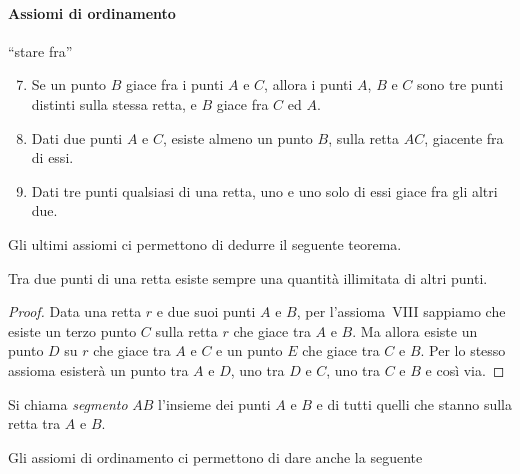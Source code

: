 \paragraph{Assiomi di ordinamento} ``stare fra''
\begin{enumerate}[label=\Roman{*}., nosep]
\setcounter{enumi}{6}
\item Se un punto \(B\) giace fra i punti \(A\) e \(C\), allora i punti 
\(A\), \(B\) e \(C\) sono tre punti distinti sulla stessa retta, e \(B\) 
giace fra \(C\) ed \(A\).
\item Dati due punti \(A\) e \(C\), esiste almeno un punto \(B\), sulla 
retta \(AC\), giacente fra di essi.
\item Dati tre punti qualsiasi di una retta, uno e uno solo di essi 
giace fra gli altri due.
\end{enumerate}

\begin{inaccessibleblock}
 \begin{center} \end{center}
\end{inaccessibleblock}

Gli ultimi assiomi ci permettono di dedurre il seguente teorema.
\begin{teorema}
Tra due punti di una retta esiste sempre una quantità illimitata di 
altri punti.
\end{teorema}

\begin{proof}
Data una retta \(r\) e due suoi punti \(A\) e \(B\), per l'assioma~VIII 
sappiamo che esiste un terzo punto \(C\) sulla retta \(r\) che giace tra 
\(A\) e \(B\). Ma allora esiste un punto \(D\) su \(r\) che giace tra \(A\) e 
\(C\) e un punto \(E\) che giace tra \(C\) e \(B\). Per lo stesso assioma 
esisterà un punto tra \(A\) e \(D\), uno tra \(D\) e \(C\), uno tra \(C\) e \(B\) 
e così via.
\end{proof}

\begin{center}

\end{center}
\begin{definizione}
Si chiama \emph{segmento} \(AB\) l'insieme dei punti \(A\) e \(B\) e di 
tutti quelli che stanno sulla retta tra \(A\) e \(B\).
\end{definizione}
Gli assiomi di ordinamento ci permettono di dare anche la seguente

